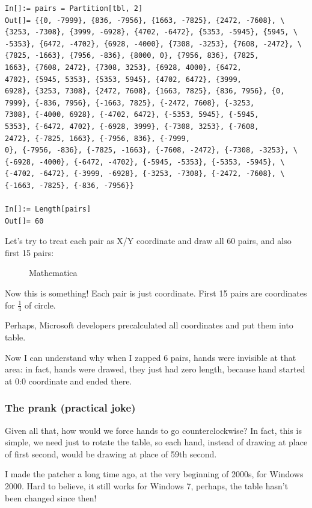 \begin{lstlisting}
In[]:= pairs = Partition[tbl, 2]
Out[]= {{0, -7999}, {836, -7956}, {1663, -7825}, {2472, -7608}, \
{3253, -7308}, {3999, -6928}, {4702, -6472}, {5353, -5945}, {5945, \
-5353}, {6472, -4702}, {6928, -4000}, {7308, -3253}, {7608, -2472}, \
{7825, -1663}, {7956, -836}, {8000, 0}, {7956, 836}, {7825, 
1663}, {7608, 2472}, {7308, 3253}, {6928, 4000}, {6472, 
4702}, {5945, 5353}, {5353, 5945}, {4702, 6472}, {3999, 
6928}, {3253, 7308}, {2472, 7608}, {1663, 7825}, {836, 7956}, {0, 
7999}, {-836, 7956}, {-1663, 7825}, {-2472, 7608}, {-3253, 
7308}, {-4000, 6928}, {-4702, 6472}, {-5353, 5945}, {-5945, 
5353}, {-6472, 4702}, {-6928, 3999}, {-7308, 3253}, {-7608, 
2472}, {-7825, 1663}, {-7956, 836}, {-7999, 
0}, {-7956, -836}, {-7825, -1663}, {-7608, -2472}, {-7308, -3253}, \
{-6928, -4000}, {-6472, -4702}, {-5945, -5353}, {-5353, -5945}, \
{-4702, -6472}, {-3999, -6928}, {-3253, -7308}, {-2472, -7608}, \
{-1663, -7825}, {-836, -7956}}

In[]:= Length[pairs]
Out[]= 60
\end{lstlisting}

Let's try to treat each pair as X/Y coordinate and draw all 60 pairs, and also first 15 pairs:

\begin{figure}[H]
\centering
{}
\caption{Mathematica}
\end{figure}

Now this is something!
Each pair is just coordinate.
First 15 pairs are coordinates for $\frac{1}{4}$ of circle.

Perhaps, Microsoft developers precalculated all coordinates and put them into table.

Now I can understand why when I zapped 6 pairs, hands were invisible at that area: in fact, hands were drawed,
they just had zero length, because hand started at 0:0 coordinate and ended there.

\subsubsection{The prank (practical joke)}

Given all that, how would we force hands to go counterclockwise?
In fact, this is simple, we need just to rotate the table, so each hand, instead of drawing at place of first second,
would be drawing at place of 59th second.

I made the patcher a long time ago, at the very beginning of 2000s, for Windows 2000.
Hard to believe, it still works for Windows 7, perhaps, the table hasn't been changed since then!

